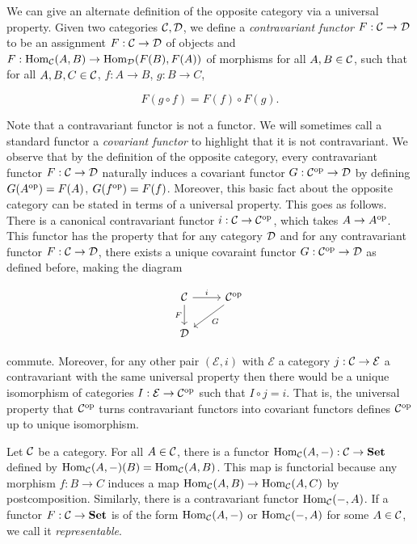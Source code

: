 \begin{rem} We can give an alternate definition of the opposite category via a universal property. Given two categories ${\mathcal C},{\mathcal D}$, we define a {\em contravariant functor} $F:{\mathcal C}\to {\mathcal D}$ to be an assignment $F:{\mathcal C}\to {\mathcal D}$ of objects and $F:\operatorname{Hom}_{{\mathcal C}}(A,B)\to \operatorname{Hom}_{{\mathcal D}}(F(B),F(A))$ of morphisms for all $A,B\in {\mathcal C}$, such that for all $A,B,C\in {\mathcal C}$, $f:A\to B$, $g:B\to C$,

$$F(g\circ f)=F(f)\circ F(g).$$

Note that a contravariant functor is not a functor. We will sometimes call a standard functor a {\em covariant functor} to highlight that it is not contravariant. We observe that by the definition of the opposite category, every contravariant functor $F:{\mathcal C}\to {\mathcal D}$ naturally induces a covariant functor $G:{\mathcal C}^{\operatorname{op}}\to {\mathcal D}$ by defining $G(A^{\operatorname{op}})=F(A)$, $G(f^{\operatorname{op}})=F(f)$. Moreover, this basic fact about the opposite category can be stated in terms of a universal property. This goes as follows. There is a canonical contravariant functor $i:{\mathcal C}\to{\mathcal C}^{\operatorname{op}}$, which takes $A\to A^{\operatorname{op}}$. This functor has the property that for any category ${\mathcal D}$ and for any contravariant functor $F:{\mathcal C}\to {\mathcal D}$, there exists a unique covaraint functor $G:{\mathcal C}^{\operatorname{op}}\to{\mathcal D}$ as defined before, making the diagram

\[\begin{tikzcd}
	\cC & {\cC^{\op}} \\
	\cD
	\arrow["i", from=1-1, to=1-2]
	\arrow["F"', from=1-1, to=2-1]
	\arrow["G", from=1-2, to=2-1]
\end{tikzcd}\]

commute. Moreover, for any other pair $(\mathcal{E},i)$ with $\mathcal{E}$ a category $j:{\mathcal C}\to\mathcal{E}$ a contravariant with the same universal property then there would be a unique isomorphism of categories $I:\mathcal{E}\to {\mathcal C}^{\operatorname{op}}$ such that $I\circ j = i$. That is, the universal property that ${\mathcal C}^{\operatorname{op}}$ turns contravariant functors into covariant functors defines ${\mathcal C}^{\operatorname{op}}$ up to unique isomorphism.
\end{rem}

\begin{ex} Let ${\mathcal C}$ be a category. For all $A\in {\mathcal C}$, there is a functor $\operatorname{Hom}_{{\mathcal C}}(A,-):{\mathcal C}\to{\bf Set}$ defined by $\operatorname{Hom}_{{\mathcal C}}(A,-)(B)=\operatorname{Hom}_{{\mathcal C}}(A,B)$. This map is functorial because any morphism $f:B\to C$ induces a map $\operatorname{Hom}_{{\mathcal C}}(A,B)\to \operatorname{Hom}_{{\mathcal C}}(A,C)$ by postcomposition. Similarly, there is a contravariant functor $\operatorname{Hom}_{{\mathcal C}}(-,A)$. If a functor $F:{\mathcal C}\to{\bf Set}$ is of the form $\operatorname{Hom}_{{\mathcal C}}(A,-)$ or $\operatorname{Hom}_{{\mathcal C}}(-,A)$ for some $A\in{\mathcal C}$, we call it {\em representable}.
\end{ex}

